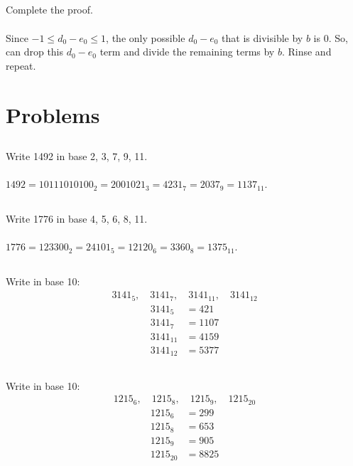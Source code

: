 \documentclass{article} \usepackage{amsmath}
\begin{document}
\subsection{}
Complete the proof.\\~\\
Since $-1 \leq d_0 - e_0 \leq 1$, the only possible $d_0 - e_0$
that is divisible by $b$ is 0.
So, can drop this $d_0 - e_0$ term and divide the remaining terms
by $b$. Rinse and repeat.

\section{Problems}

\subsection{}
Write 1492 in base 2, 3, 7, 9, 11.\\~\\
$1492 = 10111010100_2 = 2001021_3 = 4231_7 = 2037_9 = 1137_{11}$.

\subsection{}
Write 1776 in base 4, 5, 6, 8, 11.\\~\\
$1776 = 123300_2 = 24101_5 = 12120_6 = 3360_8 = 1375_{11}$.

\subsection{}
Write in base 10:
\begin{gather*}
    3141_5, \quad 3141_7, \quad 3141_{11}, \quad 3141_{12}
\end{gather*}
\begin{align*}
    3141_5 &= 421\\
    3141_7 &= 1107\\
    3141_{11} &= 4159\\
    3141_{12} &= 5377
\end{align*}

\subsection{}
Write in base 10:
\begin{gather*}
    1215_6, \quad 1215_8, \quad 1215_9, \quad 1215_{20}
\end{gather*}
\begin{align*}
    1215_6 &= 299\\
    1215_8 &= 653\\
    1215_9 &= 905\\
    1215_{20} &= 8825
\end{align*}
\end{document}
